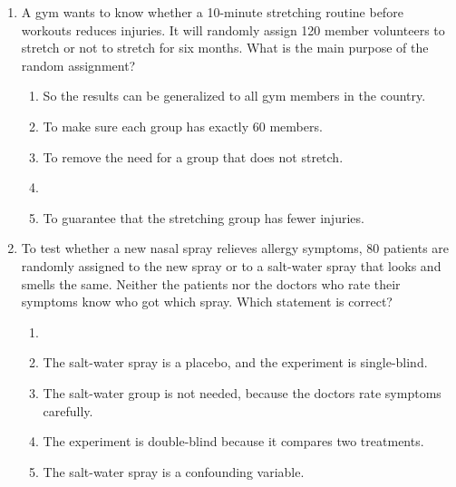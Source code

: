 \documentclass[12pt]{article}
\begin{document}
\begin{enumerate}[leftmargin=1.9em, itemsep=0.13in]
  \boxguard[14]
  \item A gym wants to know whether a 10-minute stretching routine before workouts reduces
        injuries. It will randomly assign 120 member volunteers to stretch or not to stretch
        for six months. What is the main purpose of the random assignment?
        \begin{enumerate}[label=\textbf{(\Alph*)}, leftmargin=2.2em, itemsep=2pt]
          \item So the results can be generalized to all gym members in the country.
          \item To make sure each group has exactly 60 members.
          \item To remove the need for a group that does not stretch.
          \item {}
          \item To guarantee that the stretching group has fewer injuries.\hfill{}\rule[-0.2in]{0pt}{0.48in}
        \end{enumerate}

  \boxguard[15]
  \item To test whether a new nasal spray relieves allergy symptoms, 80 patients are randomly
        assigned to the new spray or to a salt-water spray that looks and smells the same.
        Neither the patients nor the doctors who rate their symptoms know who got which spray.
        Which statement is correct?
        \begin{enumerate}[label=\textbf{(\Alph*)}, leftmargin=2.2em, itemsep=2pt]
          \item {}
          \item The salt-water spray is a placebo, and the experiment is single-blind.
          \item The salt-water group is not needed, because the doctors rate symptoms carefully.
          \item The experiment is double-blind because it compares two treatments.
          \item The salt-water spray is a confounding variable.\hfill{}\rule[-0.2in]{0pt}{0.48in}
        \end{enumerate}


\end{enumerate}
\end{document}
